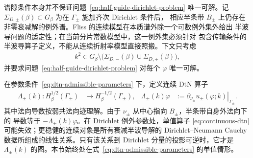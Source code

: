 谱隙条件本身并不保证问题~\eqref{eq:half-guide-dirichlet-problem} 唯一可解。记
$\Sigma_{D,\pm}(\beta)\subset G_\beta$ 为在 $\Gamma_\pm$ 施加齐次 Dirichlet 条件后，
相应半条带 $B_\pm$ 上仍存在非零衰减解的例外谱。Fliss 的连续模型在本质谱外除一个可数例外集外给出
半波导问题的适定性\cite[定理~4.1]{Fliss2013}；在当前分片常数模型中，这一例外集必须针对
包含传输条件的半波导算子定义，不能从连续折射率模型直接照搬。下文只考虑
\begin{align}
  k^2\in G_\beta\setminus
  \bigl(\Sigma_{D,-}(\beta)\cup\Sigma_{D,+}(\beta)\bigr),
  \label{eq:dtn-admissible-parameters}
\end{align}
并要求问题~\eqref{eq:half-guide-dirichlet-problem} 对每个 $\varphi$ 唯一可解。

在参数条件~\eqref{eq:dtn-admissible-parameters} 下，定义连续 DtN 算子
\begin{align}
  \Lambda_\pm(k):H^{1/2}_\beta(\Gamma_\pm)
  &\longrightarrow H^{-1/2}_\beta(\Gamma_\pm),
  &
  \Lambda_\pm(k)\varphi
  &:=\left.\partial_{\nu_\pm}u_\pm(\varphi;k)
    \right|_{\Gamma_\pm}.
  \label{eq:continuous-dtn}
\end{align}
其中法向导数按弱共法向迹理解。由于 $\nu_\pm$ 从中心指向 $B_\pm$，半条带自身外法向下的
导数等于 $-\Lambda_\pm(k)\varphi$。在 Dirichlet 例外参数处，单值算子
\eqref{eq:continuous-dtn} 可能失效；更稳健的连续对象是所有衰减半波导解的 Dirichlet--Neumann
Cauchy 数据所组成的线性关系。只有该关系到 Dirichlet 分量的投影可逆时，它才是
$\Lambda_\pm(k)$ 的图。本节始终处在式~\eqref{eq:dtn-admissible-parameters} 的单值情形。

